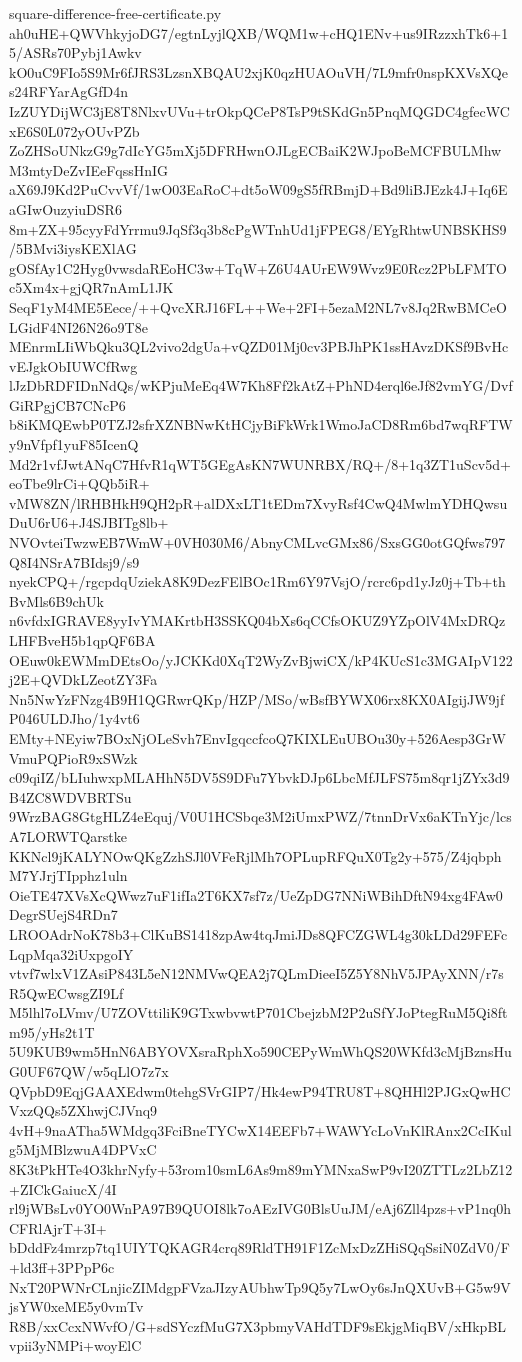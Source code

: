 \documentclass[11pt]{article}
\theoremstyle{definition}
\theoremstyle{remark}
\begin{document}
\begin{filecontents*}[overwrite]{square-difference-free-certificate.py}
ah0uHE+QWVhkyjoDG7/egtnLyjlQXB/WQM1w+cHQ1ENv+us9IRzzxhTk6+15/ASRs70Pybj1Awkv
kO0uC9FIo5S9Mr6fJRS3LzsnXBQAU2xjK0qzHUAOuVH/7L9mfr0nspKXVsXQes24RFYarAgGfD4n
IzZUYDijWC3jE8T8NlxvUVu+trOkpQCeP8TsP9tSKdGn5PnqMQGDC4gfecWCxE6S0L072yOUvPZb
ZoZHSoUNkzG9g7dIcYG5mXj5DFRHwnOJLgECBaiK2WJpoBeMCFBULMhwM3mtyDeZvIEeFqssHnIG
aX69J9Kd2PuCvvVf/1wO03EaRoC+dt5oW09gS5fRBmjD+Bd9liBJEzk4J+Iq6EaGIwOuzyiuDSR6
8m+ZX+95cyyFdYrrmu9JqSf3q3b8cPgWTnhUd1jFPEG8/EYgRhtwUNBSKHS9/5BMvi3iysKEXlAG
gOSfAy1C2Hyg0vwsdaREoHC3w+TqW+Z6U4AUrEW9Wvz9E0Rcz2PbLFMTOc5Xm4x+gjQR7nAmL1JK
SeqF1yM4ME5Eece/++QvcXRJ16FL++We+2FI+5ezaM2NL7v8Jq2RwBMCeOLGidF4NI26N26o9T8e
MEnrmLIiWbQku3QL2vivo2dgUa+vQZD01Mj0cv3PBJhPK1ssHAvzDKSf9BvHcvEJgkObIUWCfRwg
lJzDbRDFIDnNdQs/wKPjuMeEq4W7Kh8Ff2kAtZ+PhND4erql6eJf82vmYG/DvfGiRPgjCB7CNcP6
b8iKMQEwbP0TZJ2sfrXZNBNwKtHCjyBiFkWrk1WmoJaCD8Rm6bd7wqRFTWy9nVfpf1yuF85IcenQ
Md2r1vfJwtANqC7HfvR1qWT5GEgAsKN7WUNRBX/RQ+/8+1q3ZT1uScv5d+eoTbe9lrCi+QQb5iR+
vMW8ZN/lRHBHkH9QH2pR+alDXxLT1tEDm7XvyRsf4CwQ4MwlmYDHQwsuDuU6rU6+J4SJBITg8lb+
NVOvteiTwzwEB7WmW+0VH030M6/AbnyCMLvcGMx86/SxsGG0otGQfws797Q8I4NSrA7BIdsj9/s9
nyekCPQ+/rgcpdqUziekA8K9DezFElBOc1Rm6Y97VsjO/rcrc6pd1yJz0j+Tb+thBvMls6B9chUk
n6vfdxIGRAVE8yyIvYMAKrtbH3SSKQ04bXs6qCCfsOKUZ9YZpOlV4MxDRQzLHFBveH5b1qpQF6BA
OEuw0kEWMmDEtsOo/yJCKKd0XqT2WyZvBjwiCX/kP4KUcS1c3MGAIpV122j2E+QVDkLZeotZY3Fa
Nn5NwYzFNzg4B9H1QGRwrQKp/HZP/MSo/wBsfBYWX06rx8KX0AIgijJW9jfP046ULDJho/1y4vt6
EMty+NEyiw7BOxNjOLeSvh7EnvIgqccfcoQ7KIXLEuUBOu30y+526Aesp3GrWVmuPQPioR9xSWzk
c09qiIZ/bLIuhwxpMLAHhN5DV5S9DFu7YbvkDJp6LbcMfJLFS75m8qr1jZYx3d9B4ZC8WDVBRTSu
9WrzBAG8GtgHLZ4eEquj/V0U1HCSbqe3M2iUmxPWZ/7tnnDrVx6aKTnYjc/lcsA7LORWTQarstke
KKNcl9jKALYNOwQKgZzhSJl0VFeRjlMh7OPLupRFQuX0Tg2y+575/Z4jqbphM7YJrjTIpphz1uln
OieTE47XVsXcQWwz7uF1ifIa2T6KX7sf7z/UeZpDG7NNiWBihDftN94xg4FAw0DegrSUejS4RDn7
LROOAdrNoK78b3+ClKuBS1418zpAw4tqJmiJDs8QFCZGWL4g30kLDd29FEFcLqpMqa32iUxpgoIY
vtvf7wlxV1ZAsiP843L5eN12NMVwQEA2j7QLmDieeI5Z5Y8NhV5JPAyXNN/r7sR5QwECwsgZI9Lf
M5lhl7oLVmv/U7ZOVttiliK9GTxwbvwtP701CbejzbM2P2uSfYJoPtegRuM5Qi8ftm95/yHs2t1T
5U9KUB9wm5HnN6ABYOVXsraRphXo590CEPyWmWhQS20WKfd3cMjBznsHuG0UF67QW/w5qLlO7z7x
QVpbD9EqjGAAXEdwm0tehgSVrGIP7/Hk4ewP94TRU8T+8QHHl2PJGxQwHCVxzQQs5ZXhwjCJVnq9
4vH+9naATha5WMdgq3FciBneTYCwX14EEFb7+WAWYcLoVnKlRAnx2CcIKulg5MjMBlzwuA4DPVxC
8K3tPkHTe4O3khrNyfy+53rom10smL6As9m89mYMNxaSwP9vI20ZTTLz2LbZ12+ZICkGaiucX/4I
rl9jWBsLv0YO0WnPA97B9QUOI8lk7oAEzIVG0BlsUuJM/eAj6Zll4pzs+vP1nq0hCFRlAjrT+3I+
bDddFz4mrzp7tq1UIYTQKAGR4crq89RldTH91F1ZcMxDzZHiSQqSsiN0ZdV0/F+ld3ff+3PPpP6c
NxT20PWNrCLnjicZIMdgpFVzaJIzyAUbhwTp9Q5y7LwOy6sJnQXUvB+G5w9VjsYW0xeME5y0vmTv
R8B/xxCcxNWvfO/G+sdSYczfMuG7X3pbmyVAHdTDF9sEkjgMiqBV/xHkpBLvpii3yNMPi+woyElC

\end{filecontents*}
\end{document}

